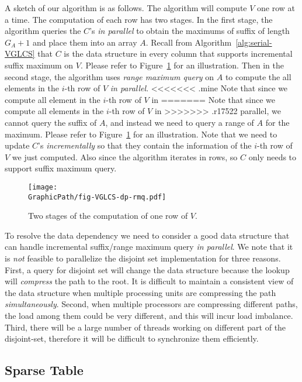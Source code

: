 A sketch of our algorithm is as follows.  The algorithm will compute
$V$ one row at a time.  The computation of each row has two stages.
In the first stage, the algorithm queries the $C$'s {\em in parallel}
to obtain the maximums of suffix of length $G_A + 1$ and place them
into an array $A$.  Recall from Algorithm~\ref{alg:serial-VGLCS} that
$C$ is the data structure in every column that supports incremental
suffix maximum on $V$.  Please refer to
Figure~\ref{fig:fig-VGLCS-dp-rmq} for an illustration.  Then in the
second stage, the algorithm uses {\em range maximum query} on $A$ to
compute the all elements in the $i$-th row of $V$ {\em in parallel}.
<<<<<<< .mine
Note that since we compute all element in the $i$-th row of $V$ in
=======
Note that since we compute all elements in the $i$-th row of $V$ in
>>>>>>> .r17522
parallel, we cannot query the suffix of $A$, and instead we need to
query a range of $A$ for the maximum.  Please refer to
Figure~\ref{fig:fig-VGLCS-dp-rmq} for an illustration.  Note that we
need to update $C$'s {\em incrementally} so that they contain the
information of the $i$-th row of $V$ we just computed.  Also since the
algorithm iterates in rows, so $C$ only needs to support suffix
maximum query.

\begin{figure}
  \texttt{[image: \\GraphicPath/fig-VGLCS-dp-rmq.pdf]}
  \caption{Two stages of the computation of one row of $V$.}
  \label{fig:fig-VGLCS-dp-rmq}
\end{figure}

To resolve the data dependency we need to consider a good data
structure that can handle incremental suffix/range maximum query {\em
  in parallel}.  We note that it is {\em not} feasible to parallelize
the disjoint set implementation for three reasons.  First, a query for
disjoint set will change the data structure because the lookup will
{\em compress} the path to the root.  It is difficult to maintain a
consistent view of the data structure when multiple processing units
are compressing the path {\em simultaneously}.  Second, when multiple
processors are compressing different paths, the load among them could
be very different, and this will incur load imbalance. Third, there
will be a large number of threads working on different part of the
disjoint-set, therefore it will be difficult to synchronize them
efficiently.

\subsection{Sparse Table}

